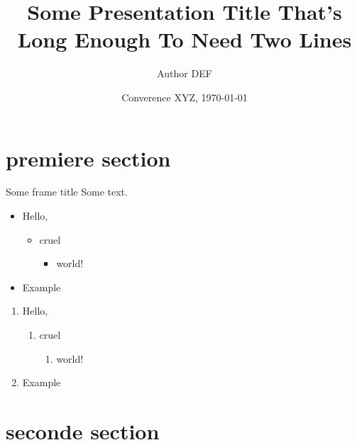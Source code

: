 \documentclass[t]{beamer}
\title{Some Presentation Title That's Long Enough To Need Two Lines}
\date[\today]{Converence XYZ, \today}
\author[Insert author]{Author DEF}
\begin{document}
\begin{frame}
\titlepage
\end{frame}


\section{premiere section}

\begin{frame}{Some frame title}
Some text.
\begin{itemize}
  \item Hello,
    \begin{itemize}
      \item cruel
        \begin{itemize}
          \item world!
        \end{itemize}
    \end{itemize}
    \item Example
\end{itemize}


\begin{enumerate}
  \item Hello,
    \begin{enumerate}
      \item cruel
        \begin{enumerate}
          \item world!
        \end{enumerate}
    \end{enumerate}
  \item Example
\end{enumerate}

\end{frame}

\section{seconde section}
\end{document}
